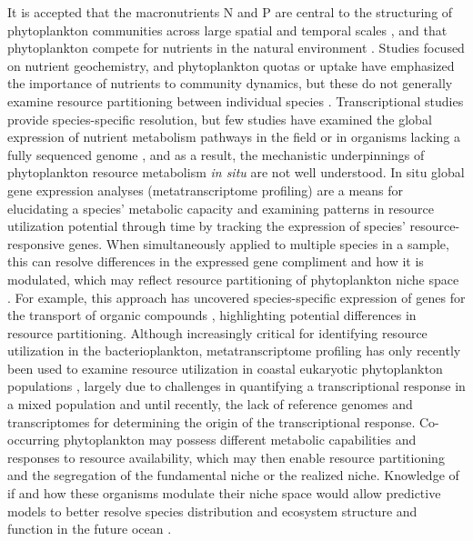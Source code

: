It is accepted that the macronutrients N and P are central to the structuring of phytoplankton communities across large spatial and temporal scales \citep{Margalef1963, Follows2007, Johnson2006b}, and that phytoplankton compete for nutrients in the natural environment \citep{Sommer1983, Sommer1985}. Studies focused on nutrient geochemistry, and phytoplankton quotas or uptake have emphasized the importance of nutrients to community dynamics, but these do not generally examine resource partitioning between individual species \citep{Hutchins1999, Zubkov2003}. Transcriptional studies provide species-specific resolution, but few studies have examined the global expression of nutrient metabolism pathways in the field \citep{Marchetti2012a} or in organisms lacking a fully sequenced genome \citep{Frischkorn2014, Moustafa2010}, and as a result, the mechanistic underpinnings of phytoplankton resource metabolism \textit{in situ} are not well understood. In situ global gene expression analyses (metatranscriptome profiling) are a means for elucidating a species' metabolic capacity and examining patterns in resource utilization potential through time by tracking the expression of species' resource-responsive genes. When simultaneously applied to multiple species in a sample, this can resolve differences in the expressed gene compliment and how it is modulated, which may reflect resource partitioning of phytoplankton niche space \citep{Gifford2013}. For example, this approach has uncovered species-specific expression of genes for the transport of organic compounds \citep{Poretsky2010, Rinta-Kanto2012a, Gifford2011}, highlighting potential differences in resource partitioning. Although increasingly critical for identifying resource utilization in the bacterioplankton, metatranscriptome profiling has only recently been used to examine resource utilization in coastal eukaryotic phytoplankton populations \citep{Dupont2015}, largely due to challenges in quantifying a transcriptional response in a mixed population and until recently, the lack of reference genomes and transcriptomes for determining the origin of the transcriptional response. Co-occurring phytoplankton may possess different metabolic capabilities and responses to resource availability, which may then enable resource partitioning and the segregation of the fundamental niche or the realized niche. Knowledge of if and how these organisms modulate their niche space would allow predictive models to better resolve species distribution and ecosystem structure and function in the future ocean \citep{Follows2007}.\par
